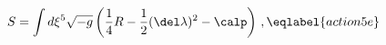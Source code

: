 \begin{equation}
S=\int d\xi^5 \sqrt{-g}\left(\frac 14  R-\frac 12(\del\lambda)^2
-\calp\right)\,,
\eqlabel{action5e}
\end{equation} 
